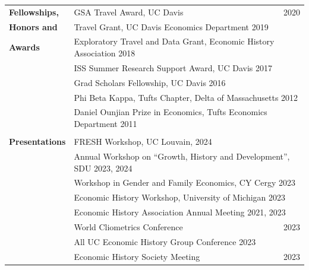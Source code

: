 \documentclass[a4paper,11pt,oneside]{article}
\begin{document}
\begin{longtable}{@{} p{0.175\linewidth} p{0.775\linewidth} p{0.05\linewidth}}
   \textbf{\large{Fellowships,}}   &  GSA Travel Award, UC Davis & \hfill  2020\\
   \textbf{\large{Honors and }}   &  \multicolumn{2}{l}{ Travel Grant, UC Davis Economics Department \hfill 2019}\\  
   \textbf{\large{Awards}}  &  \multicolumn{2}{l}{ Exploratory Travel and Data Grant, Economic History Association \hfill 2018}\\
   &  \multicolumn{2}{l}{ ISS Summer Research Support Award, UC Davis \hfill 2017}\\
   &  \multicolumn{2}{l}{ Grad Scholars Fellowship, UC Davis \hfill  2016}\\
   &  \multicolumn{2}{l}{ Phi Beta Kappa, Tufts Chapter, Delta of Massachusetts \hfill 2012}\\
   &   \multicolumn{2}{l}{ Daniel Ounjian Prize in Economics, Tufts Economics Department \hfill 2011}\\
   \\
   
   
   
   
   \textbf{\large{Presentations}}  & \multicolumn{2}{l}{FRESH Workshop, UC Louvain, 2024} \\  
   & \multicolumn{2}{l}{Annual Workshop on ``Growth, History and Development'', SDU  \hfill 2023, 2024} \\  
    & \multicolumn{2}{l}{Workshop in Gender and Family Economics, CY Cergy  \hfill 2023}\\  & \multicolumn{2}{l}{Economic History Workshop, University of Michigan \hfill 2023}\\
   & \multicolumn{2}{l}{ Economic History Association Annual Meeting   \hfill 2021, 2023}\\
   & World Cliometrics Conference &  \hfill 2023  \\
   & \multicolumn{2}{l}{ All UC Economic History Group Conference  \hfill 2023}\\
   &  Economic History Society Meeting & \hfill 2023\\


\end{longtable}
\end{document}

